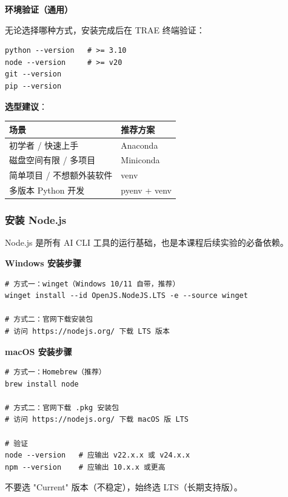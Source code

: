 \documentclass[12pt,a4paper]{ctexart}
\begin{document}
\textbf{环境验证（通用）}

无论选择哪种方式，安装完成后在 TRAE 终端验证：

\begin{lstlisting}[style=shell]
python --version   # >= 3.10
node --version     # >= v20
git --version
pip --version
\end{lstlisting}

\textbf{选型建议}：

\begin{table}[H]
\centering
\begin{tabular}{ll}
\toprule
\textbf{场景} & \textbf{推荐方案} \\
\midrule
初学者 / 快速上手 & Anaconda \\
磁盘空间有限 / 多项目 & Miniconda \\
简单项目 / 不想额外装软件 & venv \\
多版本 Python 开发 & pyenv + venv \\
\bottomrule
\end{tabular}
\end{table}

\subsubsection{安装 Node.js}

Node.js 是所有 AI CLI 工具的运行基础，也是本课程后续实验的必备依赖。

\textbf{Windows 安装步骤}

\begin{lstlisting}[style=shell]
# 方式一：winget（Windows 10/11 自带，推荐）
winget install --id OpenJS.NodeJS.LTS -e --source winget

# 方式二：官网下载安装包
# 访问 https://nodejs.org/ 下载 LTS 版本
\end{lstlisting}

\textbf{macOS 安装步骤}

\begin{lstlisting}[style=shell]
# 方式一：Homebrew（推荐）
brew install node

# 方式二：官网下载 .pkg 安装包
# 访问 https://nodejs.org/ 下载 macOS 版 LTS

# 验证
node --version   # 应输出 v22.x.x 或 v24.x.x
npm --version    # 应输出 10.x.x 或更高
\end{lstlisting}

\begin{notebox}[版本选择提示]
不要选 "Current" 版本（不稳定），始终选 LTS（长期支持版）。
\end{notebox}
\end{document}
